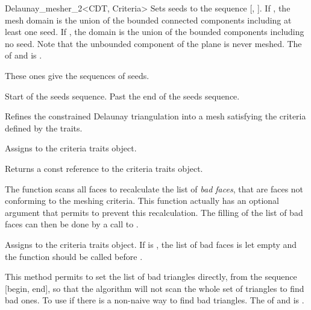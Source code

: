 \begin{ccRefClass}{Delaunay_mesher_2<CDT, Criteria>}
                       { Sets seeds to the sequence [,
                         ]. If , the mesh domain
                         is the union of the bounded connected
                         components including at least one seed. If
                         , the domain is the union of
                         the bounded components including no seed. Note
                         that the unbounded component of the plane is
                         never meshed.
                         \ccPrecond The  of
                          and  is
                         .}

These ones give the sequences of seeds.

{ Start of the seeds sequence. }
\ccGlue
{}
{ Past the end of the seeds sequence. }


{ Refines the constrained Delaunay triangulation into a mesh
  satisfying the criteria defined by the traits.
}

{ Assigns  to the criteria traits object. }

{ Returns a const reference to the criteria traits object. }

\begin{ccAdvanced}
  The function  scans all faces to recalculate the list of
  \emph{bad faces}, that are faces not conforming to the meshing criteria.
  This function actually has an optional argument that permits to prevent
  this recalculation. The filling of the list of bad faces can then be done
  by a call to .
  
  { Assigns  to the criteria traits object. If
     is , the list of bad faces is
    let empty and the function  should be called before
    .}

                   { This method permits to set the list of bad triangles
                     directly, from the sequence [begin, end], so that the
                     algorithm will not scan the whole set of triangles to
                     find bad ones. To use if there is a non-naive way to
                     find bad triangles.  \ccPrecond The 
                     of  and  is .}


\end{ccAdvanced}
\end{ccRefClass}

